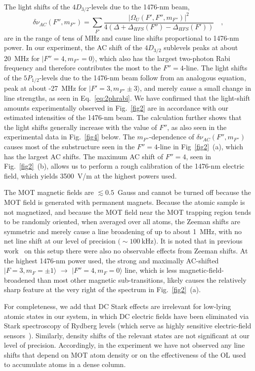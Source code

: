 \documentclass[reprint, amsmath,amssymb, aps, pra, longbibliography]{revtex4-1}
\begin{document}
The light shifts of the $4D_{3/2}$-levels due to the 1476-nm beam,
\begin{equation}
\delta\nu_{AC}(F'',m_{F''}) = \sum_{F'} \frac{|\Omega_{U} (F',F'',m_{F''})|^2}{4 (\Delta + \Delta_{HFS}(F'') - \Delta_{HFS}(F'))} \quad,
\end{equation}
are in the range of tens of MHz and cause line shifts proportional to 1476-nm power. 
In our experiment, the AC shift of the $4D_{3/2}$ sublevels peaks at about 20~MHz for $\vert F''=4, m_{F''} = 0 \rangle$, which also has the largest two-photon Rabi frequency and therefore contributes the most to the $F''=4$-line. 
The light shifts of the $5P_{1/2}$-levels due to the 1476-nm beam follow from an analogous equation, peak at about -27~MHz for $\vert F'=3, m_{F''} \pm3 \rangle$, and merely cause a small change in line strengths, as seen in Eq.~\ref{eq:2phrabi}.
We have confirmed that the light-shift amounts experimentally observed in Fig.~\ref{fig2} are in accordance with our estimated intensities of the 1476-nm beam. 
The calculation further shows that the light shifts generally increase with the value of $F''$, as also seen in the experimental data in Fig.~\ref{fig4} below. The $m_{F''}$-dependence of $\delta\nu_{AC}(F'',m_{F''})$ causes most of the substructure seen in the $F''=4$-line in Fig~\ref{fig2}~(a), which has the largest AC shifts. The maximum AC shift of $F''=4$, seen in Fig.~\ref{fig2}~(b), allows us to perform a rough calibration of the 1476-nm electric field, which yields 3500~V/m at the highest powers used. 

The MOT magnetic fields are $\lesssim 0.5$~Gauss and cannot be turned 
off because the MOT field is generated with permanent magnets. Because the atomic sample is not magnetized, and because the MOT field near the MOT trapping region tends to be randomly oriented, when averaged over all atoms, the Zeeman shifts are symmetric and merely cause a line broadening of up to about 1~MHz, with no net line shift at our level of precision $(\sim 100~$kHz). 
It is noted that in previous work~\cite{cardman2021, atoms10040117} on this setup
there were also no observable effects from Zeeman shifts.
At the highest 1476-nm power used, the strong and maximally AC-shifted $|F=3, m_F= \pm 1 \rangle$ $\rightarrow$ $|F''=4, m_F= 0 \rangle$ line, which is less magnetic-field-broadened than most other magnetic sub-transitions,
likely causes the relatively sharp feature at the very right of the spectrum in Fig.~\ref{fig2}~(a). 

For completeness, we add that DC Stark effects are irrelevant 
for low-lying atomic states in our system, in which DC electric fields have been eliminated via Stark spectroscopy of Rydberg levels (which serve as highly sensitive electric-field sensors~\cite{ionsourcepaper}). Similarly, density shifts of the relevant states are not significant at our level of precision. Accordingly, in the experiment we have not observed any line shifts that depend on MOT atom density or on the effectiveness of the OL used to accumulate atoms in a dense column.  
\end{document}
